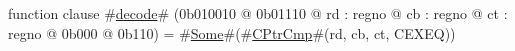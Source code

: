 function clause #\hyperref[zdecode]{decode}# (0b010010 @ 0b01110 @ rd : regno @ cb : regno @ ct : regno @ 0b000 @ 0b110) = #\hyperref[zSome]{Some}#(#\hyperref[zCPtrCmp]{CPtrCmp}#(rd, cb, ct, CEXEQ))
